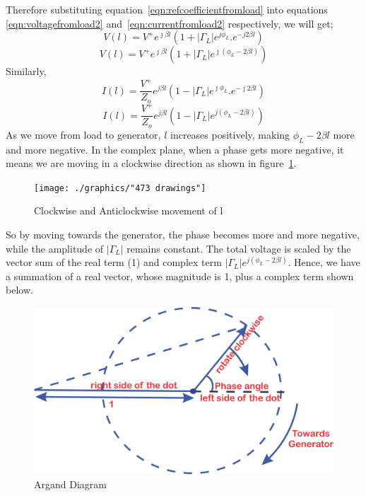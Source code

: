 Therefore substituting equation~\ref{eqn:refcoefficientfromload} into equations \ref{eqn:voltagefromload2} and~\ref{eqn:currentfromload2} respectively, we will get;
\begin{equation*}
V(l) = V^{+}e^{\jmath\beta l}(1 + |\Gamma_L|e^{j\phi_L} . e^{-j 2 \beta l})
\end{equation*}
\begin{equation}
V(l) = V^{+}e^{\jmath\beta l}(1 + |\Gamma_L|  e^{\jmath(\phi_L -2 \beta l)})
\end{equation}
Similarly,
\begin{equation*}
I(l) = \frac{V^+}{Z_o}e ^{j \beta l}( 1 - |\Gamma_L|e^{\jmath\phi_L} . e^{-\jmath 2\beta l})
\end{equation*}
\begin{equation}
I(l) = \frac{V^+}{Z_o}e ^{j \beta l}( 1 -|\Gamma_L|  e^{j(\phi_L -2 \beta l)})
\end{equation}
As we move from load to generator, $l$ increases positively, making $\phi_L -2 \beta l$ more and more negative. In the complex plane, when a phase gets more negative, it means we are moving in a clockwise direction as shown in figure~\ref{fig:473-drawings}.
\begin{figure}[h]
\centering
\texttt{[image: ./graphics/"473 drawings"]}
\caption{Clockwise and Anticlockwise movement of l}
\label{fig:473-drawings}
\end{figure}

So by moving towards the generator, the phase becomes more and more negative, while the amplitude of $|\Gamma_L|$ remains constant. The total voltage is scaled by the vector sum of the real term (1) and complex term $|\Gamma_L|  e^{j(\phi_L -2 \beta l)}$. Hence, we have a summation of a real vector, whose magnitude is 1, plus a complex term shown below. 
\begin{figure}[h]
\centering
\includegraphics[width=0.8\linewidth]{./graphics/kjhgfdwert}
\caption{Argand Diagram}
\label{fig:kjhgfdwert}
\end{figure}

